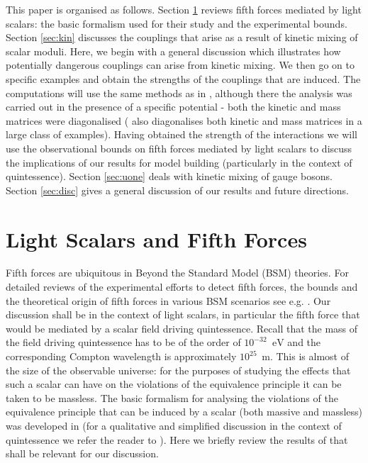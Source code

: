 \documentclass[11pt,a4paper]{article}
\begin{document}
This paper is organised as follows. Section \ref{sec:fifth} reviews fifth forces mediated by light scalars: the basic formalism used for their study and the experimental bounds. Section \ref{sec:kin} discusses the couplings that arise as a result of kinetic mixing of scalar moduli. Here, we begin with a general discussion which illustrates how potentially dangerous couplings can arise from kinetic mixing. We then go on to  specific examples and obtain the strengths of the couplings that are induced. The computations will use the same methods as in \cite{Conlon:2007gk}, although there the analysis was carried out in the presence of a specific potential - both the kinetic and mass matrices were diagonalised (\cite{Cicoli:2010ha} also diagonalises both kinetic and mass matrices in a large class of examples). Having obtained the strength of the interactions we will use the observational bounds on fifth forces mediated by light scalars to discuss the implications of our results for model building (particularly in the context of quintessence). Section \ref{sec:uone} deals with kinetic mixing of gauge bosons. Section \ref{sec:disc} gives a general discussion of our results and future directions. 



\section{Light Scalars and Fifth Forces} 

\label{sec:fifth}

Fifth forces are ubiquitous in Beyond the Standard Model (BSM) theories. For detailed reviews of the experimental efforts to detect fifth forces, the bounds and the theoretical origin of fifth forces in various BSM scenarios see e.g. \cite{Will:2014kxa, Adelberger:2003zx, Jain:2010ka}. Our discussion shall be in the context of light scalars, in particular the fifth force that would be mediated by a scalar field driving quintessence. Recall that the mass of  the field driving quintessence has to be of the order of $10^{-32} \phantom{a} \text{eV}$ and the corresponding Compton wavelength is approximately $10^{25} \phantom{s} \text{m}$. This is almost of the size of the observable universe: for the purposes of studying the effects that such a scalar can have on the violations of the equivalence principle it can be taken to be massless. The basic formalism for analysing the violations of the equivalence principle that can be induced by a scalar (both massive and massless) was developed in \cite{Damour:2010rp} (for a qualitative and simplified discussion in the context of quintessence we refer the reader to \cite{Carroll:1998zi}). Here we briefly review the results of \cite{Damour:2010rp} that shall be relevant for our discussion.
\end{document}
